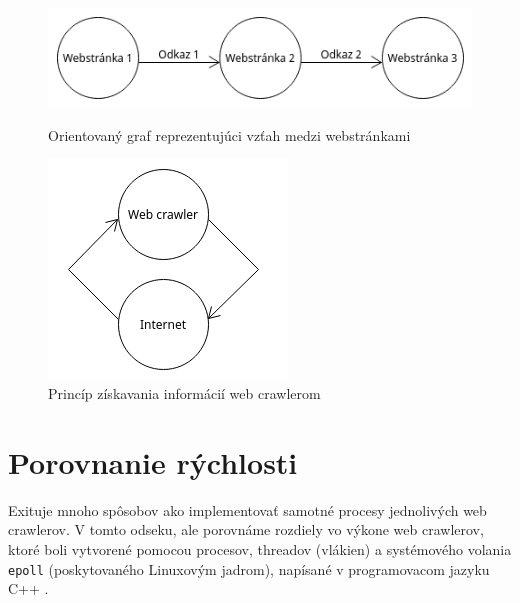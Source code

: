 \documentclass[10pt,twoside,slovak,a4paper]{article}
\begin{document}
\begin{figure}
	\centering
	\begin{minipage}{0.4\textwidth}
		\includegraphics[width=\textwidth]{diagram1.png}
		\caption{Orientovaný graf reprezentujúci vzťah medzi webstránkami}
	\end{minipage}
	\begin{minipage}{0.4\textwidth}
		\includegraphics[width=\textwidth]{diagram2.png}
		\caption{Princíp získavania informácií web crawlerom \cite{sharma2011novel}}
	\end{minipage}
\end{figure}

\section{Porovnanie rýchlosti}
Exituje mnoho spôsobov ako implementovať samotné procesy jednolivých web crawlerov. V tomto odseku, ale porovnáme rozdiely vo výkone web crawlerov, ktoré boli vytvorené pomocou procesov, threadov (vlákien) a systémového volania \texttt{epoll} (poskytovaného Linuxovým jadrom), napísané v programovacom jazyku C++ \cite{9648837}. \\
\end{document}

